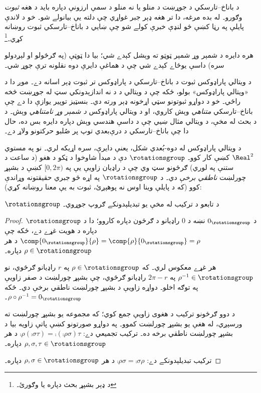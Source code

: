 \documentclass[../../../include/open-logic-section]{subfiles}
\begin{document}

د باناخ--تارسکي د جوړښت د منلو يا نه منلو د سمې ارزونې
دپاره بايد د هغه \emph{ثبوت} وګورو۔ له بده مرغه، دا تر هغه
ډېر جبر غواړي چې دلته يې بيانولے شو۔ خو د لاندې پايلې
په رڼا کښې څو لنډې خبرې کولے شو چې ښايي د باناخ--تارسکي
ثبوت روښانه کړي۔\footnote{د ډېر بشپړ بحث دپاره
\cite{Weston2003} يا \cite{Wagon2016} وګورئ۔}

\begin{thm}
هره دايره د شمېر وړ شمېر ټوټو ته وېشل کېدے شي؛ بيا دا
ټوټې (په ګرځولو او لېږدولو سره) داسې يوځاے کېدے شي
چې د هماغې دايرې دوه نقلونه ترې جوړ شي۔
\end{thm}

د ويتالي پاراډوکس ثبوت د باناخ--تارسکي د پاراډوکس تر
ثبوت ډېر اسانه دے۔ موږ دا د «ويتالي پاراډوکس» بولو، ځکه
چې د ويتالي د \citeyear{Vitali1905} د نه اندازېدونکي سټ
له جوړښت څخه راځي۔ خو د دواړو ثبوتونو سټي اړخونه ډېر
ورته دي۔ بنسټيز توپير يوازې دا دے چې باناخ--تارسکي
\emph{متناهي} وېش کاروي، او د ويتالي پاراډوکس
\emph{د شمېر وړ نامتناهي} وېش۔ د \citet{Weston2003}
د بحث له مخې، د ويتالي مثال ښيي چې د داسې هندسي وېش
دپاره دايره بس ده، حال دا چې باناخ--تارسکي د درې‌بعدي
توپ پر صُلبو حرکتونو ولاړ دے۔

د ويتالي پاراډوکس له دوه-بُعدي شکل، يعنې دايرې، سره
اړيکه لري۔ نو په مستوي $\Real^2$ کښې کار کوو۔
$\rotationsgroup$ دې د مبدأ شاوخوا د ټکو د هغو
(د ساعت د ستنې په لوري) ګرځونو سټ وي چې د راډيان
زاويې يې په $[0,2\pi)$ کښې د بشپړ چورلښت
\emph{ناطقي برخې} دي۔
د $\rotationsgroup$ په اړه څو جبري حقيقتونه وړاندې کوو
(که د پايلې وينا اوس نه پوهېږئ، ثبوت به يې معنا روښانه کړي):

\begin{lem}
$\rotationsgroup$ د تابعو د ترکيب له مخې يو تبديلېدونکے {ګروپ} جوړوي۔
\end{lem}

\begin{proof}
د $0_{\rotationsgroup}$ نښه د $0$ راډيانو د ګرځون دپاره
کاروو؛ دا د
$\rotationsgroup$ دپاره د هويت غړے دے، ځکه چې
$\comp{0_{\rotationsgroup}}{\rho} = \comp{\rho}{0_{\rotationsgroup}} =
\rho$ د هر $\rho \in \rotationsgroup$ دپاره۔

هر غړے معکوس لري۔ که $\rho \in \rotationsgroup$ په
$r$ راډيانو ګرځوي، نو $\rho^{-1} \in \rotationsgroup$
په $2\pi - r$ راډيانو ګرځوي، چې بشپړ چورلښت د صفر
زاويې په توګه اخلو۔ دواړه زاويې د بشپړ چورلښت ناطقي
برخې دي۔ ځکه $\rho \circ \rho^{-1} = 0_\rotationsgroup$۔

د دوو ګرځونو ترکيب د هغوی زاويې جمع کوي؛ که مجموعه
يو بشپړ چورلښت ته ورسېږي، له هغې يو بشپړ چورلښت کموو۔
په دواړو صورتونو کښې پاتې زاويه بيا د بشپړ چورلښت ناطقي
برخه ده۔ ترکيب تجميعي دے: $\comp{\rho}{(\comp{\sigma}{\tau})} =
\comp{(\comp{\rho}{\sigma})}{\tau}$ د هر $\rho, \sigma, \tau \in
\rotationsgroup$ دپاره۔

ترکيب تبديلېدونکے دے: $\comp{\rho}{\sigma} =
\comp{\sigma}{\rho}$ د هر $\rho, \sigma \in \rotationsgroup$ دپاره۔
\end{proof}
\end{document}
